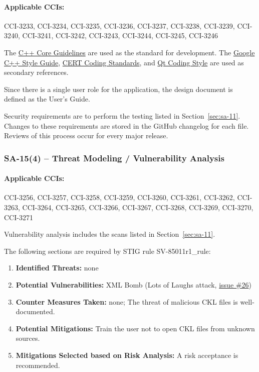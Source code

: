 \documentclass[letterpaper, 10pt, twoside]{article}
\begin{document}
\paragraph{Applicable CCIs:} CCI-3233, CCI-3234, CCI-3235, CCI-3236, CCI-3237, CCI-3238, CCI-3239, CCI-3240, CCI-3241, CCI-3242, CCI-3243, CCI-3244, CCI-3245, CCI-3246

The \href{http://isocpp.github.io/CppCoreGuidelines/CppCoreGuidelines#S-functions}{C++ Core Guidelines} are used as the standard for development. The \href{https://google.github.io/styleguide/cppguide.html}{Google C++ Style Guide}, \href{https://resources.sei.cmu.edu/downloads/secure-coding/assets/sei-cert-cpp-coding-standard-2016-v01.pdf}{CERT Coding Standards}, and \href{https://wiki.qt.io/Qt_Coding_Style}{Qt Coding Style} are used as secondary references.

Since there is a single user role for the application, the design document is defined as the User's Guide.

Security requirements are to perform the testing listed in Section~\ref{sec:sa-11}. Changes to these requirements are stored in the GitHub changelog for each file. Reviews of this process occur for every major release.

\subsubsection{SA-15(4) -- Threat Modeling / Vulnerability Analysis}

\paragraph{Applicable CCIs:} CCI-3256, CCI-3257, CCI-3258, CCI-3259, CCI-3260, CCI-3261, CCI-3262, CCI-3263, CCI-3264, CCI-3265, CCI-3266, CCI-3267, CCI-3268, CCI-3269, CCI-3270, CCI-3271

Vulnerability analysis includes the scans listed in Section~\ref{sec:sa-11}.

The following sections are required by STIG rule SV-85011r1\_rule:
\begin{enumerate}
	\item \textbf{Identified Threats:} none
	\item \textbf{Potential Vulnerabilities:} XML Bomb (Lots of Laughs attack, \href{https://github.com/squinky86/STIGQter/issues/26}{issue \#26})
	\item \textbf{Counter Measures Taken:} none; The threat of malicious CKL files is well-documented.
	\item \textbf{Potential Mitigations:} Train the user not to open CKL files from unknown sources.
	\item \textbf{Mitigations Selected based on Risk Analysis:} A risk acceptance is recommended.
\end{enumerate}
\end{document}

